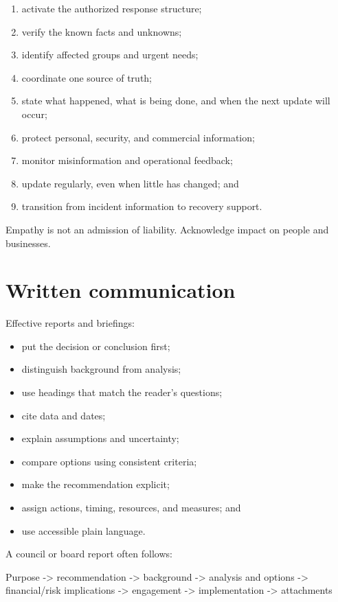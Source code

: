\documentclass[11pt,letterpaper,oneside,openany]{book}
\begin{document}
\begin{enumerate}
\item activate the authorized response structure;
\item verify the known facts and unknowns;
\item identify affected groups and urgent needs;
\item coordinate one source of truth;
\item state what happened, what is being done, and when the next update will occur;
\item protect personal, security, and commercial information;
\item monitor misinformation and operational feedback;
\item update regularly, even when little has changed; and
\item transition from incident information to recovery support.
\end{enumerate}


Empathy is not an admission of liability. Acknowledge impact on people and businesses.


\section[Written communication]{Written communication}
Effective reports and briefings:


\begin{itemize}
\item put the decision or conclusion first;
\item distinguish background from analysis;
\item use headings that match the reader's questions;
\item cite data and dates;
\item explain assumptions and uncertainty;
\item compare options using consistent criteria;
\item make the recommendation explicit;
\item assign actions, timing, resources, and measures; and
\item use accessible plain language.
\end{itemize}


A council or board report often follows:


\begin{guidequote}
Purpose -\textgreater{} recommendation -\textgreater{} background -\textgreater{} analysis and options -\textgreater{} financial/risk implications -\textgreater{} engagement -\textgreater{} implementation -\textgreater{} attachments

\end{guidequote}
\end{document}
